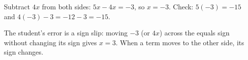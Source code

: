 Subtract $4x$ from both sides: $5x-4x=-3$, so $\boxed{x=-3}$. Check: $5(-3)=-15$ and $4(-3)-3=-12-3=-15$.

The student's error is a sign slip: moving $-3$ (or $4x$) across the equals sign without changing its sign gives $x=3$. When a term moves to the other side, its sign changes.

